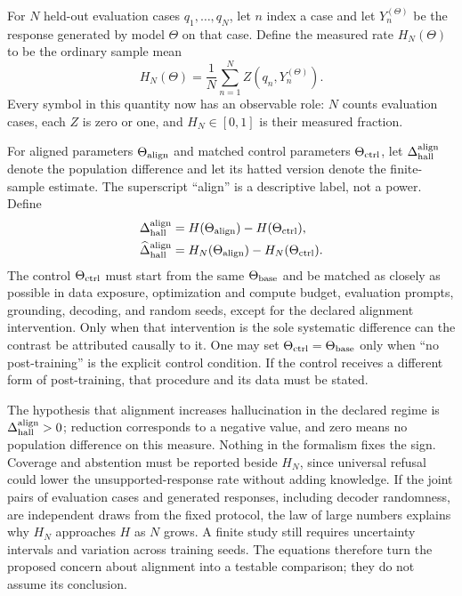 \documentclass[
  aps,
  reprint,
  superscriptaddress,
  floatfix,
  nofootinbib,
  longbibliography
]{revtex4-2}
\begin{document}
For $N$ held-out evaluation cases $q_1,\ldots,q_N$, let $n$ index a case and
let $Y_n^{(\Theta)}$ be the response generated by model $\Theta$ on that case.
Define the measured rate $H_N(\Theta)$ to be the ordinary sample mean
\begin{equation}
\label{eq:app-hallucination-rate}
H_N(\Theta)=\frac{1}{N}\sum_{n=1}^{N}
Z(q_n,Y_n^{(\Theta)}).
\end{equation}
Every symbol in this quantity now has an observable role: $N$ counts evaluation
cases, each $Z$ is zero or one, and $H_N\in[0,1]$ is their measured fraction.

For aligned parameters $\Theta_{\rm align}$ and matched control parameters
$\Theta_{\rm ctrl}$, let $\Delta_{\rm hall}^{\rm align}$ denote the population
difference and let its hatted version denote the finite-sample estimate.  The
superscript ``align'' is a descriptive label, not a power.  Define
\begin{equation}
\label{eq:app-hallucination-test}
\begin{aligned}
\Delta_{\rm hall}^{\rm align}
&=H(\Theta_{\rm align})-H(\Theta_{\rm ctrl}),\\
\widehat{\Delta}_{\rm hall}^{\rm align}
&=H_N(\Theta_{\rm align})-H_N(\Theta_{\rm ctrl}).
\end{aligned}
\end{equation}
The control $\Theta_{\rm ctrl}$ must start from the same $\Theta_{\rm base}$
and be matched as closely as possible in data exposure, optimization and
compute budget, evaluation prompts, grounding, decoding, and random seeds,
except for the declared alignment intervention.  Only when that intervention is
the sole systematic difference can the contrast be attributed causally to it.
One may set
$\Theta_{\rm ctrl}=\Theta_{\rm base}$ only when ``no post-training'' is the
explicit control condition.  If the control receives a different form of
post-training, that procedure and its data must be stated.

The hypothesis that alignment increases hallucination in the declared regime
is $\Delta_{\rm hall}^{\rm align}>0$; reduction corresponds to a negative
value, and zero means no population difference on this measure.  Nothing in
the formalism fixes the sign.  Coverage and abstention must be reported beside
$H_N$, since universal refusal could lower the unsupported-response rate
without adding knowledge.  If the joint pairs of evaluation cases and generated
responses, including decoder randomness, are independent draws from the fixed
protocol, the law of large numbers explains why $H_N$ approaches $H$ as $N$
grows.  A finite study still requires uncertainty intervals and
variation across training seeds.  The equations therefore turn the proposed
concern about alignment into a testable comparison; they do not assume its
conclusion.
\end{document}
